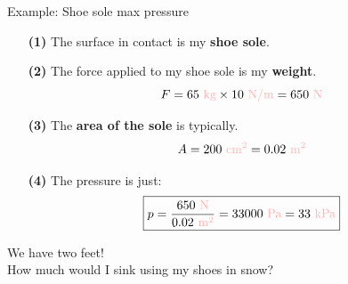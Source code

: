 \documentclass[usenames,dvipsnames]{beamer}
\begin{document}
\begin{frame}{\huge{Example: Shoe sole max pressure}}

\begin{itemize}
    \item[\bf (1)] The surface in contact is my \textbf{shoe sole}.
    \item[\bf (2)] The force applied to my shoe sole is my \textbf{weight}.
    \begin{equation*}
    F=65 \textcolor{red!30}{\text{ kg}} \times 10 \textcolor{red!30}{\text{ N/m}} = 650 \textcolor{red!30}{\text{ N}}
    \end{equation*}
    \item[\bf (3)] The \textbf{area of the sole} is typically.
    \begin{equation*}
    A= 200 \textcolor{red!30}{\text{ cm}^2} = 0.02 \textcolor{red!30}{\text{ m}^2}
    \end{equation*}
    \item[\bf (4)] The pressure is just:
    \begin{equation*}
        \boxed{p=\frac{650\textcolor{red!30}{\text{ N}}}{0.02\textcolor{red!30}{\text{ m}^2}}= 33000 \textcolor{red!30}{\text{ Pa}}=33 \textcolor{red!30}{\text{ kPa}}}
    \end{equation*}
\end{itemize}

We have two feet!\\

How much would I sink using my shoes in snow?\\
\end{frame}



\end{document}

